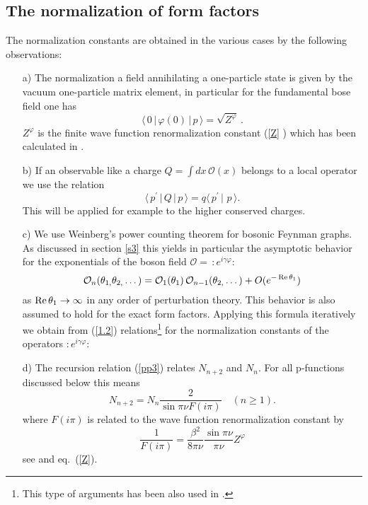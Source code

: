 \documentclass[a4paper,a4paper]{article}
\begin{document}
\subsection{The normalization of form factors}

The normalization constants are obtained in the various cases by the
following observations:

\begin{enumerate}
\item[a)]  The normalization a field annihilating a one-particle state is
given by the vacuum one-particle matrix element, in particular for the
fundamental bose field one has 
\begin{equation}
\langle \,0\,|\,\varphi (0)\,|\,p\,\rangle =\sqrt{Z^{\varphi }}\,.
\label{Na}
\end{equation}
$Z^{\varphi }$ is the finite wave function renormalization constant (\ref{Z}%
) which has been calculated in \cite{KW}.

\item[b)]  If an observable like a charge $Q=\int dx\,\mathcal{O}(x)$
belongs to a local operator we use the relation 
\[
\langle \,p^{\prime }\,|\,Q\,|\,p\,\rangle =q\langle \,p^{\prime
}\,|\,\,p\,\rangle . 
\]
This will be applied for example to the higher conserved charges.

\item[c)]  We use Weinberg's power counting theorem for bosonic Feynman
graphs. As discussed in section \ref{s3} this yields in particular the
asymptotic behavior for the exponentials of the boson field $\mathcal{O}%
=\,:\!e^{i\gamma \varphi }\!:$ 
\[
\mathcal{O}_{n}(\theta _{1,}\theta _{2,}\dots )=\mathcal{O}_{1}(\theta
_{1})\,\mathcal{O}_{n-1}(\theta _{2,}\dots )+O(e^{-\mathop{\rm Re}\theta
_{1}}) 
\]
as $\mathop{\rm Re}\theta _{1}\rightarrow \infty $ in any order of
perturbation theory. This behavior is also assumed to hold for the exact
form factors. Applying this formula iteratively we obtain from (\ref{1.2})
relations\footnote{%
This type of arguments has been also used in \cite{KW,FMS,KM,MS}.} for the
normalization constants of the operators $:e^{i\gamma \varphi }:$

\item[d)]  The recursion relation (\ref{pp3}) relates $N_{n+2}$ and $N_{n}.$
For all p-functions discussed below this means 
\begin{equation}
N_{n+2}=N_{n}\frac{2}{\sin \pi \nu F(i\pi )}\quad (n\geq 1).  \label{N}
\end{equation}
where $F(i\pi )$ is related to the wave function renormalization constant by 
\[
\frac{1}{F(i\pi )}=\frac{\beta ^{2}}{8\pi \nu }\frac{\sin \pi \nu }{\pi \nu }%
Z^{\varphi } 
\]
see \cite{BK} and eq.~(\ref{Z}).
\end{enumerate}
\end{document}
